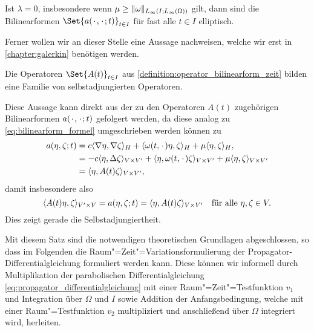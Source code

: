 \documentclass[../main.tex]{subfiles}
\begin{document}
\begin{Korollar}
\label{korollar:bilinearform_elliptisch}
    Ist $\lambda = 0$, insbesondere wenn $\mu \geq \norm{\omega}_{L_{\infty}(I; L_{\infty}(\Omega))}$ gilt, dann sind die Bilinearformen $\Set{a(\blank, \blank; t)}_{t \in I}$ für fast alle $t \in I$ elliptisch.
\end{Korollar}

Ferner wollen wir an dieser Stelle eine Aussage nachweisen, welche wir erst in \cref{chapter:galerkin} benötigen werden.

\begin{Lemma}
\label{lemma:operator_selbstadjungiert}
    Die Operatoren $\Set{A(t)}_{t \in I}$ aus \cref{definition:operator_bilinearform_zeit} bilden eine Familie von selbstadjungierten Operatoren.

    \begin{Beweis}
        Diese Aussage kann direkt aus der zu den Operatoren $A(t)$ zugehörigen Bilinearformen $a(\blank, \blank; t)$ gefolgert werden, da diese analog zu \cref{eq:bilinearform_formel} umgeschrieben werden können zu
        \begin{equation}
        \begin{aligned}
            a(\eta, \zeta; t)
            &= c\skp{\grad \eta}{\grad \zeta}{H} + \skp{\omega(t, \blank) \eta}{\zeta}{H} + \mu \skp{\eta}{\zeta}{H},
            \\&= - c\skp{\eta}{\Delta \zeta}{V \times V'} + \skp{\eta}{\omega(t, \blank) \zeta}{V \times V'} + \mu \skp{\eta}{\zeta}{V \times V'}
            \\&= \skp{\eta}{A(t) \zeta}{V \times V'},
        \end{aligned}
        \end{equation}
        damit insbesondere also
        \begin{equation}
            \skp{A(t)\eta}{\zeta}{V' \times V} = a(\eta, \zeta; t) = \skp{\eta}{A(t) \zeta}{V \times V'} \quad \fa \eta, \zeta \in V.
        \end{equation}
        Dies zeigt gerade die Selbstadjungiertheit.
    \end{Beweis}
\end{Lemma}

Mit diesem Satz sind die notwendigen theoretischen Grundlagen abgeschlossen, so dass im Folgenden die Raum"=Zeit"=Variationsformulierung der Propagator-Differentialgleichung formuliert werden kann.
Diese können wir informell durch Multiplikation der parabolischen Differentialgleichung \cref{eq:propagator_differentialgleichung} mit einer Raum"=Zeit"=Testfunktion $v_{1}$ und Integration über $\Omega$ und $I$ sowie Addition der Anfangsbedingung, welche mit einer Raum"=Testfunktion $v_{2}$ multipliziert und anschließend über $\Omega$ integriert wird, herleiten.
\end{document}
